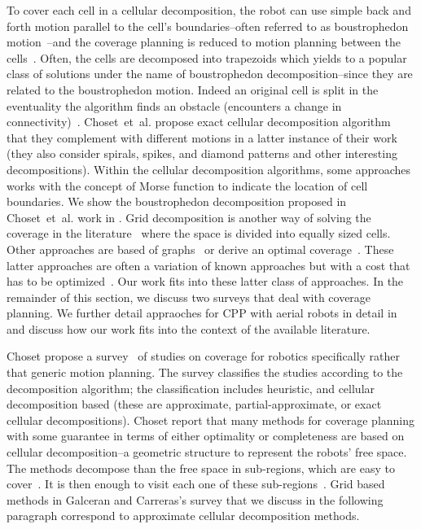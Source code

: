 To cover each cell in a cellular decomposition, the robot can use simple back and forth motion parallel to the cell's boundaries--often referred to as boustrophedon motion~\citep{lavalle2006planning}--and the coverage planning is reduced to motion planning between the cells~\citep{choset2001coverage}. Often, the cells are decomposed into trapezoids which yields to a popular class of solutions under the name of boustrophedon decomposition--since they are related to the boustrophedon motion. Indeed an original cell is split in the eventuality the algorithm finds an obstacle (encounters a change in connectivity)~\citep{choset2000exact}. Choset~et~al. propose exact cellular decomposition algorithm~\citep{choset1998coverage} that they complement with different motions in a latter instance of their work~\citep{choset2000exact} (they also consider spirals, spikes, and diamond patterns and other interesting decompositions). Within the cellular decomposition algorithms, some approaches~\citep{choset2000exact,acar2002morse} works with the concept of Morse function to indicate the location of cell boundaries. We show the boustrophedon decomposition proposed in Choset~et~al. work in . Grid decomposition is another way of solving the coverage in the literature~\citep{zelinsky1993planning,gabriely2002spiral} where the space is divided into equally sized cells. Other approaches are based of graphs~\citep{cheng2019graph} or derive an optimal coverage~\citep{huang2001optimal,xu2011optimal,lee2011smooth,li2011coverage,wei2018coverage}. These latter approaches are often a variation of known approaches but with a cost that has to be optimized~\citep{galceran2013survey}. Our work fits into these latter class of approaches. In the remainder of this section, we discuss two surveys that deal with coverage planning. We further detail appraoches for CPP with aerial robots in detail in  and discuss how our work fits into the context of the available literature.


Choset propose a survey~\citep{choset2001coverage} of studies on coverage for robotics specifically rather that generic motion planning. The survey classifies the studies according to the decomposition algorithm; the classification includes heuristic, and cellular decomposition based (these are approximate, partial-approximate, or exact cellular decompositions). Choset report that many methods for coverage planning with some guarantee in terms of either optimality or completeness are based on cellular decomposition--a geometric structure to represent the robots' free space. The methods decompose than the free space in sub-regions, which are easy to cover~\citep{galceran2013survey}. It is then enough to visit each one of these sub-regions~\citep{galceran2013survey}. Grid based methods in Galceran and Carreras's survey that we discuss in the following paragraph correspond to approximate cellular decomposition methods. 

